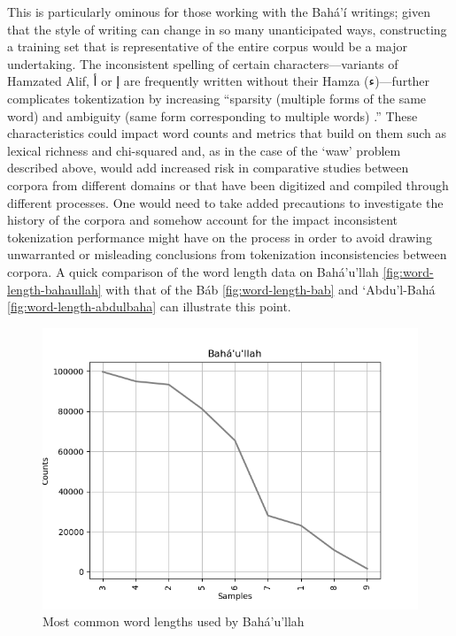 \documentclass[12pt, oneside]{report}
\begin{document}
This is particularly ominous for those working with the Bah\'{a}'\'{i} writings; given that the style of writing can change in so many unanticipated ways, constructing a training set that is representative of the entire corpus would be a major undertaking.
The inconsistent spelling of certain characters–--variants of Hamzated Alif, أ or إ are frequently written without their Hamza (ء)---further complicates tokentization by increasing ``sparsity (multiple forms of the same word) and ambiguity (same form corresponding to multiple words) \cite{habash_arabic_2006}.''
These characteristics could impact word counts and metrics that build on them such as lexical richness and chi-squared and, as in the case of the `waw' problem described above, would add increased risk in comparative studies between corpora from different domains or that have been digitized and compiled through different processes.
One would need to take added precautions to investigate the history of the corpora and somehow account for the impact inconsistent tokenization performance might have on the process in order to avoid drawing unwarranted or misleading conclusions from tokenization inconsistencies between corpora.
A quick comparison of the word length data on Bah\'{a}'u'llah \autoref{fig:word-length-bahaullah} with that of the B\'{a}b \autoref{fig:word-length-bab} and `Abdu'l-Bah\'{a} \autoref{fig:word-length-abdulbaha} can illustrate this point.
\begin{figure}[htb]
	\centering
	\includegraphics[width=15cm]{figures/word-length-bahaullah.png}
	\caption[Most common word lengths used by Bah\'{a}'u'llah]{Most common word lengths used by Bah\'{a}'u'llah}
	\label{fig:word-length-bahaullah}
\end{figure}
\end{document}
